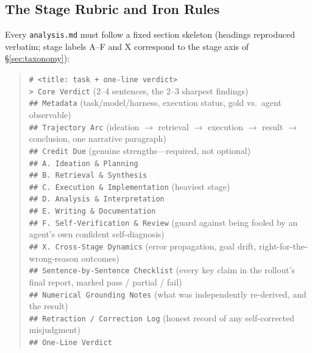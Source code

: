 \subsection{The Stage Rubric and Iron Rules}
\label{app:evaluator:rubric}

Every \texttt{analysis.md} must follow a fixed section skeleton (headings
reproduced verbatim; stage labels A--F and X correspond to the \taxonomy stage
axis of \S\ref{sec:taxonomy}):

\begin{quote}\small
\texttt{\# <title: task + one-line verdict>} \\
\texttt{> Core Verdict} (2--4 sentences, the 2--3 sharpest findings) \\
\texttt{\#\# Metadata} (task/model/harness, execution status, gold vs.\ agent observable) \\
\texttt{\#\# Trajectory Arc} (ideation $\to$ retrieval $\to$ execution $\to$ result $\to$ conclusion, one narrative paragraph) \\
\texttt{\#\# Credit Due} (genuine strengths---required, not optional) \\
\texttt{\#\# A. Ideation \& Planning} \\
\texttt{\#\# B. Retrieval \& Synthesis} \\
\texttt{\#\# C. Execution \& Implementation} (heaviest stage) \\
\texttt{\#\# D. Analysis \& Interpretation} \\
\texttt{\#\# E. Writing \& Documentation} \\
\texttt{\#\# F. Self-Verification \& Review} (guard against being fooled by an agent's own confident self-diagnosis) \\
\texttt{\#\# X. Cross-Stage Dynamics} (error propagation, goal drift, right-for-the-wrong-reason outcomes) \\
\texttt{\#\# Sentence-by-Sentence Checklist} (every key claim in the rollout's final report, marked pass / partial / fail) \\
\texttt{\#\# Numerical Grounding Notes} (what was independently re-derived, and the result) \\
\texttt{\#\# Retraction / Correction Log} (honest record of any self-corrected misjudgment) \\
\texttt{\#\# One-Line Verdict}
\end{quote}

